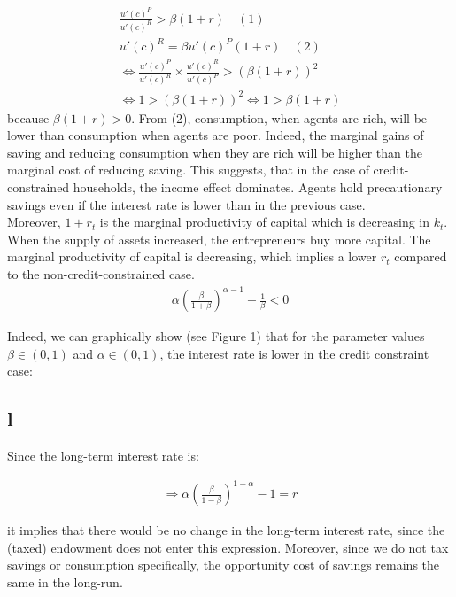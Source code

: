 \documentclass{article}
\begin{document}
\begin{gather*}
    \frac{u'(c)^P}{u'(c)^R}>\beta (1+r)\quad (1)\\
    u'(c)^R=\beta u'(c)^P(1+r)\quad (2)\\
    \Leftrightarrow \frac{u'(c)^P}{u'(c)^R} \times \frac{u'(c)^R}{u'(c)^P}>(\beta (1+r))^2\\
    \Leftrightarrow 1>(\beta (1+r))^2\Leftrightarrow 1>\beta (1+r)
\end{gather*}
because $\beta (1+r)>0$. From (2), consumption, when agents are rich, will be lower than consumption when agents are poor. Indeed, the marginal gains of saving and reducing consumption when they are rich will be higher than the marginal cost of reducing saving. This suggests, that in the case of credit-constrained households, the income effect dominates. Agents hold precautionary savings even if the interest rate is lower than in the previous case. \\

Moreover, $1+r_t$ is the marginal productivity of capital which is decreasing in $k_t$. When the supply of assets increased, the entrepreneurs buy more capital. The marginal productivity of capital is decreasing, which implies a lower $r_t$ compared to the non-credit-constrained case.
\begin{gather*}
    \alpha \left ( \frac{\beta}{1+\beta} \right ) ^{\alpha-1}-\frac{1}{\beta} < 0
\end{gather*}

Indeed, we can graphically show (see Figure 1) that for the parameter values $\beta \in (0,1)$ and $\alpha \in (0,1)$, the interest rate is lower in the credit constraint case: \\


\color{black}

\newpage

\subsection{l}

Since the long-term interest rate is:

\begin{gather*}
    \Rightarrow \alpha \left ( \frac{\beta}{1-\beta} \right ) ^{1-\alpha}-1=r
\end{gather*}

it implies that there would be no change in the long-term interest rate, since the (taxed) endowment does not enter this expression. Moreover, since we do not tax savings or consumption specifically, the opportunity cost of savings remains the same in the long-run.
\end{document}
